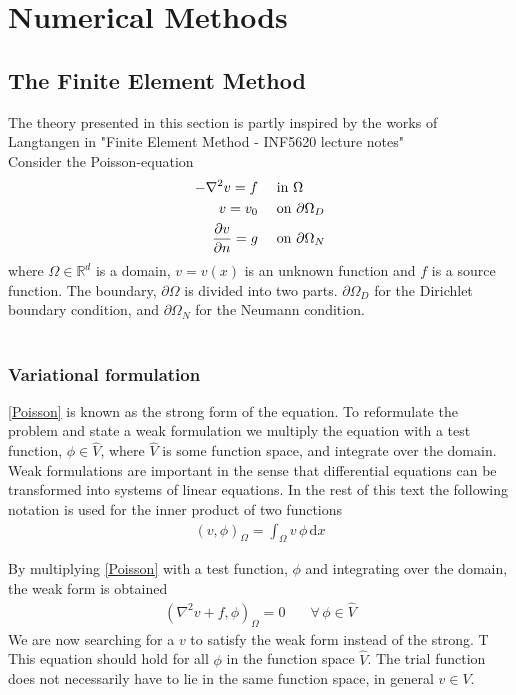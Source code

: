 \chapter{Numerical Methods}
\section{The Finite Element Method}
The theory presented in this section is partly inspired by the works of Langtangen in "Finite Element Method - INF5620 lecture notes" \cite{Lang2}  \\
Consider the Poisson-equation
\begin{align}
-\nabla^2 v = f & \quad \text{ in } \Omega \label{Poisson}\\
v = v_0 & \quad \text{ on } \partial \label{Poisson_D}\Omega_D \\
\frac{\partial v}{\partial n} = g & \quad \text{ on } \partial \Omega_N \label{Poisson_N}
\end{align}
where $\Omega \in \mathbb{R}^d$ is a domain, $ v = v(x)$ is an unknown function and $f$ is a source function. The boundary, $\partial \Omega$ is divided into two parts. $\partial \Omega_D$ for the Dirichlet boundary condition, and $\partial \Omega_N$ for the Neumann condition. 
\\
\\
\subsection{Variational formulation}
\eqref{Poisson} is known as the strong form of the equation. To reformulate the problem and state a weak formulation we multiply the equation with a test function, $\phi \in \hat{V}$, where $\hat{V}$ is some function space, and integrate over the domain. Weak formulations are important in the sense that differential equations can be transformed into systems of linear equations. In the rest of this text the following notation is used for the inner product of two functions
\begin{align} (v,\phi)_{\Omega} = \int_{\Omega} v \, \phi \, \mathrm{d}x
\end{align}

By multiplying \eqref{Poisson} with a test function, $\phi$ and integrating over the domain, the weak form is obtained
\begin{align}
(\nabla^2 v + f, \phi)_\Omega = 0 & \quad \forall \, \phi \in\hat{V} \label{Projection}
\end{align}
We are now searching for a $v$ to satisfy the weak form instead of the strong. T
This equation should hold for all $\phi$ in the function space $\hat{V}$. The trial function does not necessarily have to lie in the same function space, in general $v \in V$. \\

